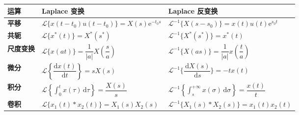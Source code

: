 \documentclass[UTF8,fontset=fandol,zihao=5]{ctexart}
\newcommand{\dd}{\,\mathrm{d}}
\begin{document}
\begin{table}[H]
  \centering
  \renewcommand{\arraystretch}{1.5}
  \begin{tabularx}{\textwidth}{
    @{}>{\bfseries}p{1.5cm}
    >{\centering\arraybackslash}X
    >{\centering\arraybackslash}X@{}
  }
    \toprule
    运算 & Laplace 变换 & Laplace 反变换 \\
    \midrule

    平移
    & $\mathcal{L}\{x(t-t_0)u(t-t_0)\}
        =X(s)\mathrm{e}^{-t_0s}$
    & $\mathcal{L}^{-1}\{X(s-s_0)\}
        =x(t)u(t)\mathrm{e}^{s_0t}$ \\

    共轭
    & $\mathcal{L}\{x^*(t)\}=X^*(s^*)$
    & $\mathcal{L}^{-1}\{X^*(s^*)\}=x^*(t)$ \\

    尺度变换
    & $\mathcal{L}\{x(at)\}
        =\dfrac{1}{|a|}X\left(\dfrac{s}{a}\right)$
    & $\mathcal{L}^{-1}\{X(as)\}
        =\dfrac{1}{|a|}x\left(\dfrac{t}{a}\right)$ \\

    微分
    & $\mathcal{L}\left\{\dfrac{\mathrm{d}x(t)}{\mathrm{d}t}\right\}
        =sX(s)$
    & $\mathcal{L}^{-1}\{\dfrac{\dd X(s)}{\dd s}\}
        =-tx(t)$ \\

    积分
    & $\mathcal{L}\left\{\displaystyle\int_0^t
        x(\tau)\,\mathrm{d}\tau\right\}
        =\dfrac{X(s)}{s}$
    & $\mathcal{L}^{-1}\left\{\displaystyle\int_s^{+\infty}
        x(\sigma)\,\mathrm{d}\sigma\right\}
        =\dfrac{x(t)}{t}$ \\

    卷积
    & $\mathcal{L}\{x_1(t) \ast x_2(t)\}
        =X_1(s)X_2(s)$
    & $\mathcal{L}^{-1}\{X_1(s) \ast X_2(s)\}
        =x_1(t)x_2(t)$ \\

    \bottomrule
  \end{tabularx}
\end{table}

\end{document}
